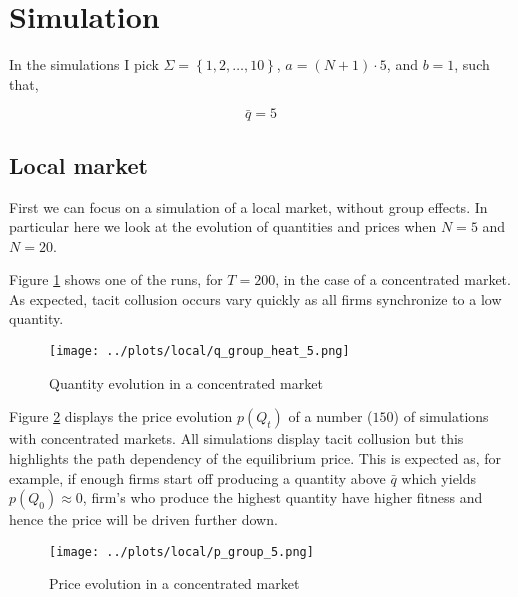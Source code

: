 \documentclass[american]{scrartcl}
\newcommand{\set}[1]{\left\{#1\right\}}
\begin{document}
\newpage
\section{Simulation}

In the simulations I pick $\Sigma = \set{1, 2, \ldots, 10}$, $a = (N + 1) \cdot 5$, and $b = 1$, such that,

\begin{equation}
    \bar{q} = 5
\end{equation}

\subsection{Local market}

First we can focus on a simulation of a local market, without group effects. In particular here we look at the evolution of quantities and prices when $N = 5$ and $N = 20$.

Figure \ref{fig:small_local} shows one of the runs, for $T = 200$, in the case of a concentrated market. As expected, tacit collusion occurs vary quickly as all firms synchronize to a low quantity.

\begin{center}
    \begin{figure}[h!]
        \texttt{[image: ../plots/local/q\_group\_heat\_5.png]}
        \caption{Quantity evolution in a concentrated market}
        \label{fig:small_local}
    \end{figure}
\end{center}

Figure \ref{fig:price_small_local} displays the price evolution $p(Q_t)$ of a number ($150$) of simulations with concentrated markets. All simulations display tacit collusion but this highlights the path dependency of the equilibrium price. This is expected as, for example, if enough firms start off producing a quantity above $\bar{q}$ which yields $p(Q_0) \approx 0$, firm's who produce the highest quantity have higher fitness and hence the price will be driven further down.

\begin{center}
    \begin{figure}[h!]
        \texttt{[image: ../plots/local/p\_group\_5.png]}
        \caption{Price evolution in a concentrated market}
        \label{fig:price_small_local}
    \end{figure}
\end{center}
\end{document}

